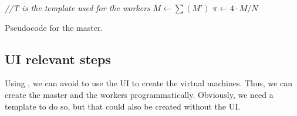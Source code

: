 \documentclass[a4paper]{article}
\begin{document}
\begin{algorithm}[htbp]
{}
\textit{//T is the template used for the workers}\;
$M \leftarrow \sum(M')$\;
$\pi \leftarrow 4 \cdot M/N$\;
\caption{Pseudocode for the master.}
\label{alg:master_2}
\end{algorithm}

\subsection{UI relevant steps}


Using , we can avoid to use the UI to create the virtual machines. Thus, we can create the master and the workers programmatically. Obviously, we need a template to do so, but that could also be created without the UI.
\end{document}

